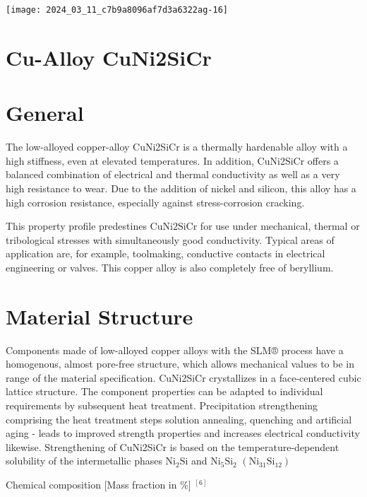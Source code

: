 \documentclass[10pt]{article}
\begin{document}
\begin{center}
\texttt{[image: 2024\_03\_11\_c7b9a8096af7d3a6322ag-16]}
\end{center}

\section*{Cu-Alloy CuNi2SiCr}
\section*{General}
The low-alloyed copper-alloy CuNi2SiCr is a thermally hardenable alloy with a high stiffness, even at elevated temperatures. In addition, CuNi2SiCr offers a balanced combination of electrical and thermal conductivity as well as a very high resistance to wear. Due to the addition of nickel and silicon, this alloy has a high corrosion resistance, especially against stress-corrosion cracking.

This property profile predestines $\mathrm{CuNi} 2 \mathrm{SiCr}$ for use under mechanical, thermal or tribological stresses with simultaneously good conductivity. Typical areas of application are, for example, toolmaking, conductive contacts in electrical engineering or valves. This copper alloy is also completely free of beryllium.

\section*{Material Structure}
Components made of low-alloyed copper alloys with the SLM® process have a homogenous, almost pore-free structure, which allows mechanical values to be in range of the material specification. CuNi2SiCr crystallizes in a face-centered cubic lattice structure. The component properties can be adapted to individual requirements by subsequent heat treatment. Precipitation strengthening comprising the heat treatment steps solution annealing, quenching and artificial aging - leads to improved strength properties and increases electrical conductivity likewise. Strengthening of CuNi2SiCr is based on the temperature-dependent solubility of the intermetallic phases $\mathrm{Ni}_{2} \mathrm{Si}$ and $\mathrm{Ni}_{5} \mathrm{Si}_{2}$ $\left(\mathrm{Ni}_{31} \mathrm{Si}_{12}\right)$

Chemical composition [Mass fraction in \%] ${ }^{[6]}$
\end{document}
